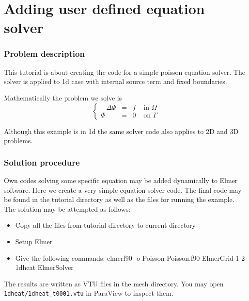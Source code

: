 \chapter{Adding user defined equation solver}


\subsection*{Problem description}

This tutorial is about creating the code for a simple poisson equation solver.
The solver is applied to 1d case with internal source term and fixed boundaries.

Mathematically the problem we solve is
\begin{equation}
\left \{
\begin{array}{cccc}
- \Delta \Phi &= &f & \mbox{ in } \Omega \\
\Phi&=&0 & \mbox{ on } \Gamma
\end{array}
\right .
\end{equation}

Although this example is in 1d the same solver code also applies to 2D and 3D
problems.

\subsection*{Solution procedure}

Own codes solving some specific equation may be added dynamically to Elmer 
software. Here we create a very simple equation solver code. The final code
may be found in the tutorial directory as well as the files for running
the example. The solution may be attempted as follows:

\begin{itemize}
\item Copy all the files from tutorial directory to current directory
\item Setup Elmer
\item Give the following commands:
\ttbegin
elmerf90 -o Poisson Poisson.f90
ElmerGrid 1 2 1dheat
ElmerSolver
\ttend
\end{itemize}
The results are written as VTU files in the mesh directory. You may open
{\tt 1dheat/1dheat\_t0001.vtu} in ParaView to inspect them.

